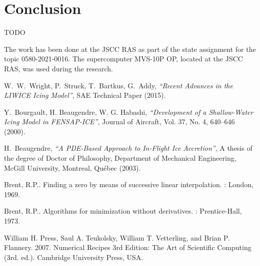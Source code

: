 \documentclass[
11pt,%
tightenlines,%
twoside,%
onecolumn,%
nofloats,%
nobibnotes,%
nofootinbib,%
superscriptaddress,%
noshowpacs,%
centertags]%
{revtex4}
\begin{document}
\section{Conclusion}

TODO

\begin{acknowledgments}
The work has been done at the JSCC RAS as part of the state assignment for the topic 0580-2021-0016.
The supercomputer MVS-10P OP, located at the JSCC RAS, was used during the research.
\end{acknowledgments}

\begin{thebibliography}{99}

W.~W.~Wright, P.~Struck, T.~Bartkus, G.~Addy, {\it ``Recent Advances in the LIWICE Icing Model''}, SAE Technical Paper (2015).

Y.~Bourgault, H. Beaugendre, W. G. Habashi, {\it ``Development of a Shallow-Water Icing Model in FENSAP-ICE''}, Journal of Aircraft, Vol. 37, No. 4, 640--646 (2000).

H.~Beaugendre, {\it ``A PDE-Based Approach to In-Flight Ice Accretion''}, A thesis of the degree of Doctor of Philosophy, Department of Mechanical Engineering, McGill University, Montreal, Qu\'ebec (2003).

Brent, R.P.. Finding a zero by means of successive linear interpolation. : London, 1969.

Brent, R.P.. Algorithms for minimization without derivatives. : Prentice-Hall, 1973.

William H. Press, Saul A. Teukolsky, William T. Vetterling, and Brian P. Flannery. 2007. Numerical Recipes 3rd Edition: The Art of Scientific Computing (3rd. ed.). Cambridge University Press, USA.


\end{thebibliography}
\end{document}
